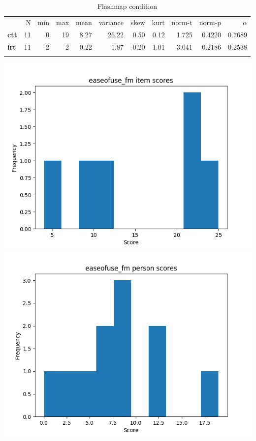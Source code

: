 \begin{longtable}[c]{@{}lrrrrrrrrrr@{}}
\caption{Flashmap condition}
\endfirsthead
\toprule\addlinespace
& N & min & max & mean & variance & skew & kurt & norm-t &
norm-p & $\alpha$
\\\addlinespace
\midrule
\textbf{ctt} & 11 & 0 & 19 & 8.27 & 26.22 & 0.50 & 0.12 & 1.725 & 0.4220
& 0.7689
\\\addlinespace
\textbf{irt} & 11 & -2 & 2 & 0.22 & 1.87 & -0.20 & 1.01 & 3.041 & 0.2186
& 0.2538
\\\addlinespace
\bottomrule
\end{longtable}

\includegraphics[width=\textwidth]{img/easeofuse_fm_diff.png}
\includegraphics[width=\textwidth]{img/easeofuse_fm_abil.png}

